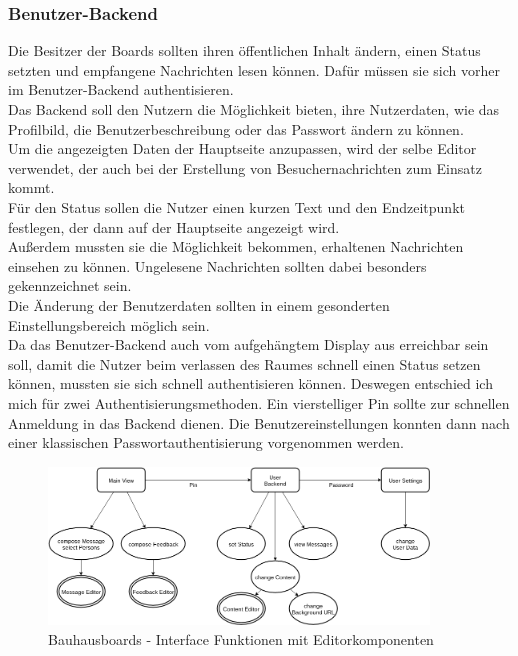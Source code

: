 \subsubsection{Benutzer-Backend}\label{Benutzer-Backend}
Die Besitzer der Boards sollten ihren öffentlichen Inhalt ändern, einen Status setzten und empfangene Nachrichten lesen können.
Dafür müssen sie sich vorher im Benutzer-Backend authentisieren.
\\
Das Backend soll den Nutzern die Möglichkeit bieten, ihre Nutzerdaten, wie das Profilbild, die Benutzerbeschreibung oder das Passwort ändern zu können.
\\
Um die angezeigten Daten der Hauptseite anzupassen, wird der selbe Editor verwendet, der auch bei der Erstellung von Besuchernachrichten zum Einsatz kommt.
\\
Für den Status sollen die Nutzer einen kurzen Text und den Endzeitpunkt festlegen, der dann auf der Hauptseite angezeigt wird.
\\
Außerdem mussten sie die Möglichkeit bekommen, erhaltenen Nachrichten einsehen zu können. Ungelesene Nachrichten sollten dabei besonders gekennzeichnet sein.\\
Die Änderung der Benutzerdaten sollten in einem gesonderten Einstellungsbereich möglich sein.
\\
Da das Benutzer-Backend auch vom aufgehängtem Display aus erreichbar sein soll, damit die Nutzer beim verlassen des Raumes schnell einen Status setzen können, mussten sie sich schnell authentisieren können. Deswegen entschied ich mich für zwei Authentisierungsmethoden. Ein vierstelliger Pin sollte zur schnellen Anmeldung in das Backend dienen. Die Benutzereinstellungen konnten dann nach einer klassischen Passwortauthentisierung vorgenommen werden.
\begin{figure}[h!]
  \centering
    \includegraphics[width=0.9\textwidth]{./img/LocationsFrontend.png}
  \caption{Bauhausboards - Interface Funktionen mit Editorkomponenten}
  \label{img:Interface}
\end{figure}

